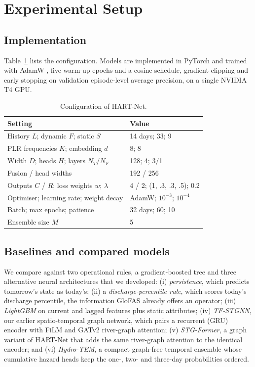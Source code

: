 \documentclass[conference]{IEEEtran}
\newcommand{\model}{HART-Net}
\begin{document}
\section{Experimental Setup}
\subsection{Implementation}
Table~\ref{tab:settings} lists the configuration. Models are implemented in
PyTorch \cite{paszke2019} and trained with AdamW \cite{loshchilov2019}, five
warm-up epochs and a cosine schedule, gradient clipping and early stopping on
validation episode-level average precision, on a single NVIDIA T4 GPU.

\begin{table}[t]
\caption{Configuration of \model{}.}
\label{tab:settings}
\centering\footnotesize
\begin{tabular}{@{}p{}p{}@{}}
\toprule
Setting & Value \\
\midrule
History $L$; dynamic $F$; static $S$ & 14 days; 33; 9 \\
PLR frequencies $K$; embedding $d$ & 8; 8 \\
Width $D$; heads $H$; layers $N_T$/$N_F$ & 128; 4; 3/1 \\
Fusion / head widths & 192 / 256 \\
Outputs $C$ / $R$; loss weights $w$; $\lambda$ & 4 / 2; (1, .3, .3, .5); 0.2 \\
Optimiser; learning rate; weight decay & AdamW; $10^{-3}$; $10^{-4}$ \\
Batch; max epochs; patience & 32 days; 60; 10 \\
Ensemble size $M$ & 5 \\
\bottomrule
\end{tabular}
\end{table}

\subsection{Baselines and compared models}
We compare against two operational rules, a gradient-boosted tree and three
alternative neural architectures that we developed: (i) \emph{persistence},
which predicts tomorrow's state as today's; (ii) a \emph{discharge-percentile
rule}, which scores today's discharge percentile, the information GloFAS
already offers an operator; (iii) \emph{LightGBM} \cite{ke2017} on current and
lagged features plus static attributes; (iv) \emph{TF-STGNN}, our earlier spatio-temporal graph network,
which pairs a recurrent (GRU) encoder with FiLM and GATv2 river-graph attention;
(v) \emph{STG-Former}, a graph variant of \model{} that adds the same
river-graph attention to the identical encoder; and (vi) \emph{Hydro-TEM}, a
compact graph-free temporal ensemble whose cumulative hazard heads keep the
one-, two- and three-day probabilities ordered.
\end{document}
